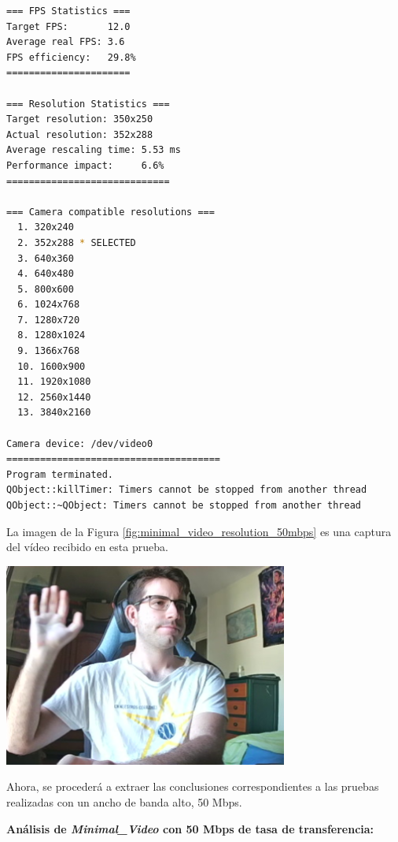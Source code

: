 \begin{lstlisting}[language=bash,basicstyle=\ttfamily\tiny]
=== FPS Statistics ===
Target FPS:       12.0
Average real FPS: 3.6
FPS efficiency:   29.8%
======================

=== Resolution Statistics ===
Target resolution: 350x250
Actual resolution: 352x288
Average rescaling time: 5.53 ms
Performance impact:     6.6%
=============================

=== Camera compatible resolutions ===
  1. 320x240
  2. 352x288 * SELECTED
  3. 640x360
  4. 640x480
  5. 800x600
  6. 1024x768
  7. 1280x720
  8. 1280x1024
  9. 1366x768
  10. 1600x900
  11. 1920x1080
  12. 2560x1440
  13. 3840x2160

Camera device: /dev/video0
======================================
Program terminated.
QObject::killTimer: Timers cannot be stopped from another thread
QObject::~QObject: Timers cannot be stopped from another thread
\end{lstlisting}
\vspace{\baselineskip}

\newpage
La imagen de la Figura \ref{fig:minimal_video_resolution_50mbps} es una captura del vídeo recibido en esta prueba.
\begin{center}
  \includegraphics[width = 0.7\textwidth]{images/VideoRecibido3.3.png}
  \label{fig:minimal_video_resolution_50mbps}
\end{center}

\newpage

Ahora, se procederá a extraer las conclusiones correspondientes a las pruebas realizadas con un ancho de banda alto, 50 Mbps.
\vspace{\baselineskip}

\textbf{Análisis de \textit{Minimal\_Video} con 50 Mbps de tasa de transferencia:}
\vspace{\baselineskip}

